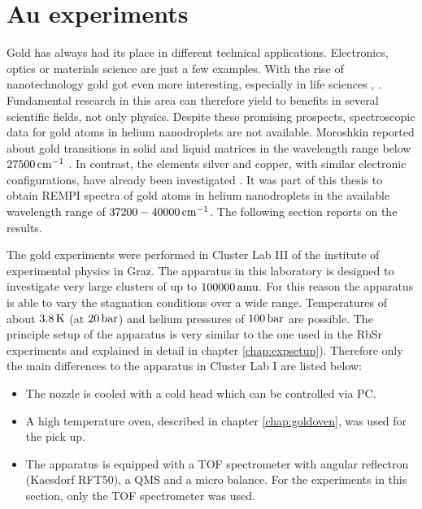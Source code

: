 \documentclass[parskip,12pt,headsepline,a4paper] {scrbook}
\begin{document}
\section{Au experiments}
\vspace{-1\baselineskip}
Gold has always had its place in different technical applications. Electronics, optics or materials science are just a few examples. With the rise of nanotechnology gold got even more interesting, especially in life sciences \cite{biogold1}, \cite{biogold2}. Fundamental research in this area can therefore yield to benefits in several scientific fields, not only physics. Despite these promising prospects, spectroscopic data for gold atoms in helium nanodroplets are not available. Moroshkin reported about gold transitions in solid and liquid matrices in the wavelength range below $\unit[27500]{cm^{-1}}$ \cite{moroshkin}. In contrast, the elements silver and copper, with similar electronic configurations, have already been investigated \cite{loginov2007excited} \cite{cufritz}.
It was part of this thesis to obtain REMPI spectra of gold atoms in helium nanodroplets in the available wavelength range of $\unit[37200-40000]{cm^{-1}}$. The following section reports on the results.

The gold experiments were performed in Cluster Lab III of the institute of experimental physics in Graz. The apparatus in this laboratory is designed to investigate very large clusters of up to $\unit[100000]{amu}$. For this reason the apparatus is able to vary the stagnation conditions over a wide range. Temperatures of about $\unit[3.8]{K}$ (at $\unit[20]{bar}$) and helium pressures of $\unit[100]{bar}$ are possible. The principle setup of the apparatus is very similar to the one used in the RbSr experiments and explained in detail in chapter \ref{chap:expsetup}). Therefore only the main differences to the apparatus in Cluster Lab I are listed below:

\begin{itemize}
\item The nozzle is cooled with a cold head which can be controlled via PC.
\item A high temperature oven, described in chapter \ref{chap:goldoven}, was used for the pick up.
\item The apparatus is equipped with a TOF spectrometer with angular reflectron (Kaesdorf RFT50), a QMS and a micro balance. For the experiments in this section, only the TOF spectrometer was used.
\end{itemize}
\end{document}
